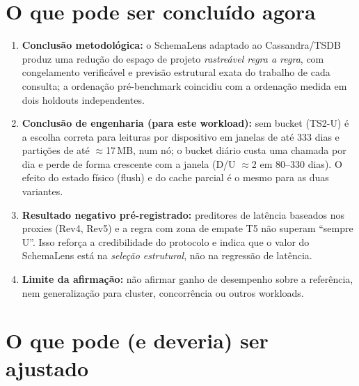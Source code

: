 \documentclass[11pt,a4paper]{article}
\begin{document}
\section{O que pode ser concluído agora}
\begin{enumerate}
\item \textbf{Conclusão metodológica:} o SchemaLens adaptado ao Cassandra/TSDB produz uma redução do espaço de projeto \emph{rastreável regra a regra}, com congelamento verificável e previsão estrutural exata do trabalho de cada consulta; a ordenação pré-benchmark coincidiu com a ordenação medida em dois holdouts independentes.
\item \textbf{Conclusão de engenharia (para este workload):} sem bucket (TS2-U) é a escolha correta para leituras por dispositivo em janelas de até 333 dias e partições de até $\approx$17\,MB, num nó; o bucket diário custa uma chamada por dia e perde de forma crescente com a janela (D/U $\approx$2 em 80--330 dias). O efeito do estado físico (flush) e do cache parcial é o mesmo para as duas variantes.
\item \textbf{Resultado negativo pré-registrado:} preditores de latência baseados nos proxies (Rev4, Rev5) e a regra com zona de empate T5 não superam ``sempre U''. Isso reforça a credibilidade do protocolo e indica que o valor do SchemaLens está na \emph{seleção estrutural}, não na regressão de latência.
\item \textbf{Limite da afirmação:} não afirmar ganho de desempenho sobre a referência, nem generalização para cluster, concorrência ou outros workloads.
\end{enumerate}

\section{O que pode (e deveria) ser ajustado}
\end{document}
